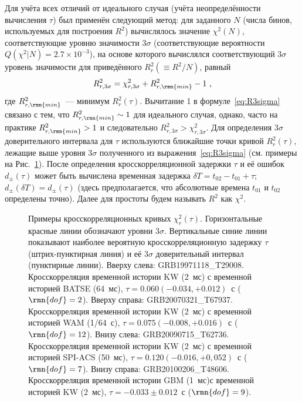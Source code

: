 Для учёта всех отличий от идеального случая (учёта неопределённости вычисления $\tau$) 
был применён следующий метод: 
для заданного $N$ (числа бинов, используемых для построения $R^2$) вычислялось значение $\chi^2(N)$, 
соответствующие уровню значимости $3\sigma$ (соответствующие вероятности $Q(\chi^2|N)=2.7\times 10^{-3}$), 
на основе которого вычислялся соответствующий $3\sigma$ уровень значимости для приведённого $R^2_r(\equiv R^2/N)$, равный
\begin{equation}\label{eq:R3sigma}
R^2_{r,3\sigma} = \chi^2_{r,3\sigma} + R^2_{r,\rmn{min}} - 1 \mbox{ ,}
\end{equation}
где $R^2_{r,\rmn{min}}$~--- минимум $R^2_{r}(\tau)$. 
Вычитание 1 в формуле~\ref{eq:R3sigma} связано с тем, 
что $R^2_{r,\rmn{min}}\sim 1$ для идеального случая, однако, часто на практике $R^2_{r,\rmn{min}}> 1$ 
и следовательно $R^2_{r,3\sigma} > \chi^2_{r,3\sigma}$. Для определения $3\sigma$ 
доверительного интервала для $\tau$ используются ближайшие точки кривой  $R^2_{r}(\tau)$, 
лежащие выше уровня $3\sigma$ полученного из выражения~\ref{eq:R3sigma} (см. примеры на Рис.~\ref{img:CC_examples}). 
После определения кросскорреляционной задержки $\tau$ и её ошибок $d_{\pm}(\tau)$ 
может быть вычислена временная задержка $\delta T = t_{02} - t_{01} + \tau$; 
$d_{\pm}(\delta T) = d_{\pm}(\tau)$ (здесь предполагается, что абсолютные времена $t_{01}$ 
и $t_{02}$ определены точно). Далее для простоты будем называть $R^2$ как $\chi^2$.

\begin{figure}[h]
    \caption[Примеры кросскорреляций временных историй]
  {Примеры кросскорреляционных кривых $\chi^2_{r}(\tau)$. 
  Горизонтальные красные линии обозначают уровни $3\sigma$. 
  Вертикальные синие линии показывают наиболее вероятную кросскорреляционную задержку $\tau$ 
  (штрих-пунктирная линия) и её $3\sigma$ доверительный интервал (пунктирные линии).
  Вверху слева: GRB19971118\_T29008. Кросскорреляция временной истории KW (2~мс) с временной историей BATSE (64~мс),
  $\tau = 0.060 (-0.034,+0.012)$~с ($\rmn{dof} = 2$). 
  Вверху справа: GRB20070321\_T67937. Кросскорреляция временной истории KW (2~мс) с временной историей WAM (1/64~с),
  $\tau = 0.075 (-0.008,+0.016)$~с ($\rmn{dof} = 12$). 
  Внизу слева: GRB20090715\_T62736. Кросскорреляция временной истории KW (2~мс) с временной историей SPI-ACS (50~мс),
  $\tau = 0.120 (-0.016,+0,052)$~с ($\rmn{dof} = 7$). 
  Внизу справа: GRB20100206\_T48606. Кросскорреляция временной истории GBM (1~мс)с временной историей KW (2~мс),
  $\tau = -0.033 \pm 0.012$~с ($\rmn{dof} = 9$).
  }
  \label{img:CC_examples}  
\end{figure}
\FloatBarrier

